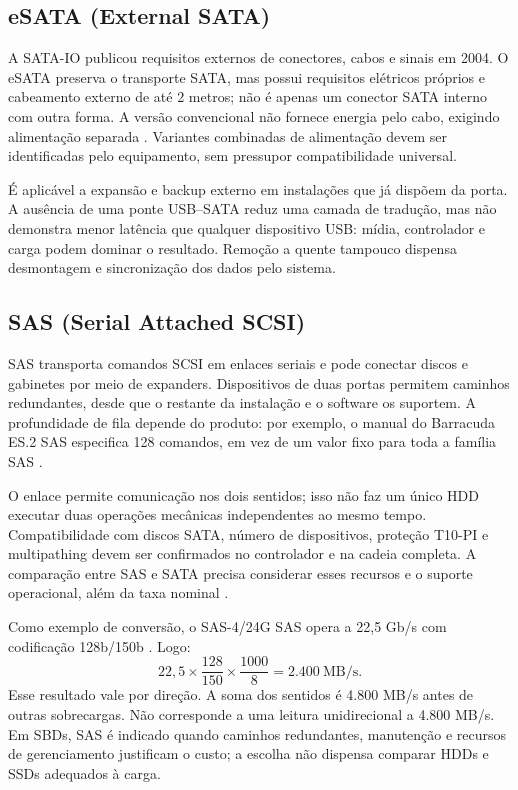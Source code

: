 \documentclass[titlepage]{article}
\begin{document}
\subsection{eSATA (External SATA)}
A SATA-IO publicou requisitos externos de conectores, cabos e sinais em 2004. O eSATA preserva o transporte SATA, mas possui requisitos elétricos próprios e cabeamento externo de até 2 metros; não é apenas um conector SATA interno com outra forma. A versão convencional não fornece energia pelo cabo, exigindo alimentação separada \cite{sata_esata}. Variantes combinadas de alimentação devem ser identificadas pelo equipamento, sem pressupor compatibilidade universal.

É aplicável a expansão e backup externo em instalações que já dispõem da porta. A ausência de uma ponte USB--SATA reduz uma camada de tradução, mas não demonstra menor latência que qualquer dispositivo USB: mídia, controlador e carga podem dominar o resultado. Remoção a quente tampouco dispensa desmontagem e sincronização dos dados pelo sistema.

\subsection{SAS (Serial Attached SCSI)}
SAS transporta comandos SCSI em enlaces seriais e pode conectar discos e gabinetes por meio de expanders. Dispositivos de duas portas permitem caminhos redundantes, desde que o restante da instalação e o software os suportem. A profundidade de fila depende do produto: por exemplo, o manual do Barracuda ES.2 SAS especifica 128 comandos, em vez de um valor fixo para toda a família SAS \cite{seagate_sas}.

O enlace permite comunicação nos dois sentidos; isso não faz um único HDD executar duas operações mecânicas independentes ao mesmo tempo. Compatibilidade com discos SATA, número de dispositivos, proteção T10-PI e multipathing devem ser confirmados no controlador e na cadeia completa. A comparação entre SAS e SATA precisa considerar esses recursos e o suporte operacional, além da taxa nominal \cite{microchip_storage,seagate_sas}.

Como exemplo de conversão, o SAS-4/24G SAS opera a 22,5 Gb/s com codificação 128b/150b \cite{microchip_sas4}. Logo:
\[
22{,}5\times\frac{128}{150}\times\frac{1000}{8}
=2.400\ \mathrm{MB/s}.
\]
Esse resultado vale por direção. A soma dos sentidos é 4.800 MB/s antes de outras sobrecargas. Não corresponde a uma leitura unidirecional a 4.800 MB/s. Em SBDs, SAS é indicado quando caminhos redundantes, manutenção e recursos de gerenciamento justificam o custo; a escolha não dispensa comparar HDDs e SSDs adequados à carga.
\end{document}
